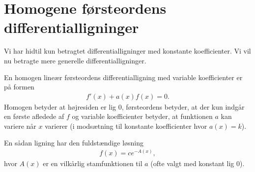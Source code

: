 \section{Homogene førsteordens differentialligninger}
\noindent Vi har hidtil kun betragtet differentialligninger med konstante koefficienter. Vi vil nu betragte mere generelle differentialligninger.

En homogen lineær førsteordens differentialligning med variable koefficienter er på formen 
\begin{align*}
f'(x) + a(x)f(x)=0.
\end{align*}
Homogen betyder at højresiden er lig $0$, førsteordens betyder, at der kun indgår en første afledede af $f$ og variable koefficienter betyder, at funktionen $a$ kan variere når $x$ varierer (i modsætning til konstante koefficienter hvor $a(x)=k$).

En sådan ligning har den fuldstændige løsning 
\begin{align}\label{eq:diffeq3et}
f(x)=ce^{-A(x)},
\end{align}
hvor $A(x)$ er en vilkårlig stamfunktionen til $a$ (ofte valgt med konstant lig $0$).

